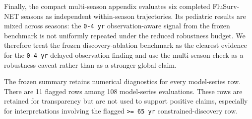 Finally, the compact multi-season appendix evaluates six completed
FluSurv-NET seasons as independent within-season trajectories. Its pediatric
results are mixed across seasons: the \texttt{0-4 yr} observation-aware signal
from the frozen benchmark is not uniformly repeated under the reduced
robustness budget. We therefore treat the frozen discovery-ablation benchmark
as the clearest evidence for the \texttt{0-4 yr} delayed-observation finding
and use the multi-season check as a robustness caveat rather than as a
stronger global claim.

The frozen summary retains numerical diagnostics for every model-series row.
There are 11 flagged rows among 108 model-series evaluations. These rows are
retained for transparency but are not used to support positive claims,
especially for interpretations involving the flagged \texttt{>= 65 yr}
constrained-discovery row.
